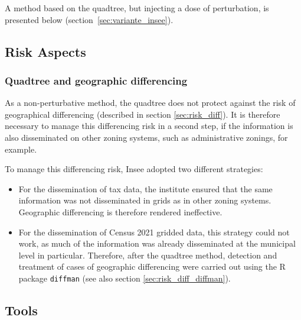 A method based on the quadtree, but injecting a dose of perturbation, is presented below (section~\ref{sec:variante_insee}).

\subsection{Risk Aspects}

\subsubsection{Quadtree and geographic differencing}

As a non-perturbative method, the quadtree does not protect against the risk of geographical differencing (described in section \ref{sec:risk_diff}). It is therefore necessary to manage this differencing risk in a second step, if the information is also disseminated on other zoning systems, such as administrative zonings, for example.

To manage this differencing risk, Insee adopted two different strategies:

\begin{itemize}
    \item For the dissemination of tax data, the institute ensured that the same information was not disseminated in grids as in other zoning systems. Geographic differencing is therefore rendered ineffective.
    \item For the dissemination of Census 2021 gridded data, this strategy could not work, as much of the information was already disseminated at the municipal level in particular. Therefore, after the quadtree method, detection and treatment of cases of geographic differencing were carried out using the R package \texttt{diffman} \citep{diffman} (see also section \ref{sec:risk_diff_diffman}).
\end{itemize}


\subsection{Tools}

